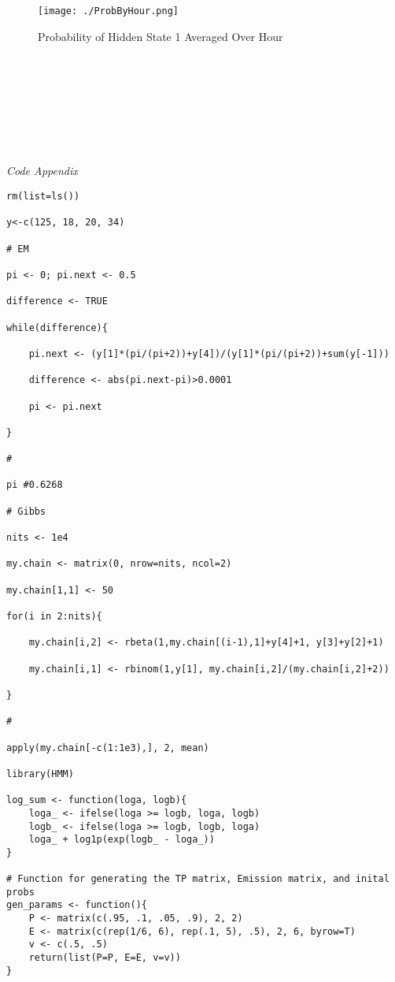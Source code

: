\documentclass{article} %
\begin{document}
\begin{enumerate}
\begin{figure}
  \caption{Probability of Hidden State 1 Averaged Over Hour}
  \centering
    \texttt{[image: ./ProbByHour.png]}
\end{figure}

~\\
~\\
~\\
~\\
~\\
~\\
~\\

\emph{Code Appendix}

\begin{verbatim}
rm(list=ls())

y<-c(125, 18, 20, 34)

# EM

pi <- 0; pi.next <- 0.5

difference <- TRUE

while(difference){

    pi.next <- (y[1]*(pi/(pi+2))+y[4])/(y[1]*(pi/(pi+2))+sum(y[-1]))

    difference <- abs(pi.next-pi)>0.0001

    pi <- pi.next

}

#

pi #0.6268

# Gibbs

nits <- 1e4

my.chain <- matrix(0, nrow=nits, ncol=2)

my.chain[1,1] <- 50

for(i in 2:nits){

    my.chain[i,2] <- rbeta(1,my.chain[(i-1),1]+y[4]+1, y[3]+y[2]+1)

    my.chain[i,1] <- rbinom(1,y[1], my.chain[i,2]/(my.chain[i,2]+2))

}

#

apply(my.chain[-c(1:1e3),], 2, mean)

library(HMM)

log_sum <- function(loga, logb){
    loga_ <- ifelse(loga >= logb, loga, logb)
    logb_ <- ifelse(loga >= logb, logb, loga)
    loga_ + log1p(exp(logb_ - loga_))
}

# Function for generating the TP matrix, Emission matrix, and inital probs
gen_params <- function(){
    P <- matrix(c(.95, .1, .05, .9), 2, 2)
    E <- matrix(c(rep(1/6, 6), rep(.1, 5), .5), 2, 6, byrow=T)
    v <- c(.5, .5)
    return(list(P=P, E=E, v=v))
}


\end{verbatim}
\end{enumerate}
\end{document}
